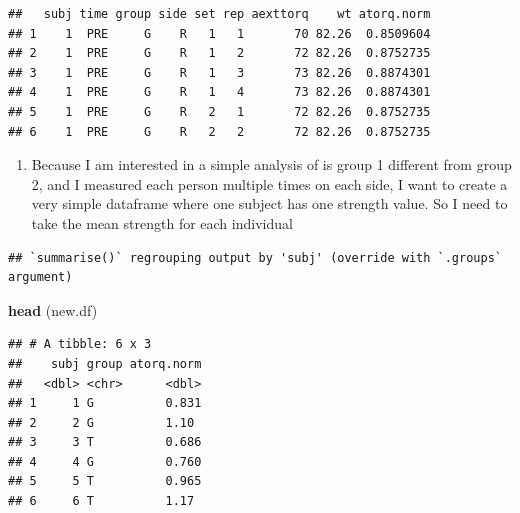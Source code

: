 \documentclass[
]{book}
\newenvironment{Shaded}{\begin{snugshade}}{\end{snugshade}}
\newcommand{\DataTypeTok}[1]{\textcolor[rgb]{0.13,0.29,0.53}{#1}}
\newcommand{\KeywordTok}[1]{\textcolor[rgb]{0.13,0.29,0.53}{\textbf{#1}}}
\newcommand{\NormalTok}[1]{#1}
\newcommand{\OperatorTok}[1]{\textcolor[rgb]{0.81,0.36,0.00}{\textbf{#1}}}
\newcommand{\StringTok}[1]{\textcolor[rgb]{0.31,0.60,0.02}{#1}}
\providecommand{\tightlist}{%
  \setlength{\itemsep}{0pt}\setlength{\parskip}{0pt}}
\begin{document}
\begin{verbatim}
##   subj time group side set rep aexttorq    wt atorq.norm
## 1    1  PRE     G    R   1   1       70 82.26  0.8509604
## 2    1  PRE     G    R   1   2       72 82.26  0.8752735
## 3    1  PRE     G    R   1   3       73 82.26  0.8874301
## 4    1  PRE     G    R   1   4       73 82.26  0.8874301
## 5    1  PRE     G    R   2   1       72 82.26  0.8752735
## 6    1  PRE     G    R   2   2       72 82.26  0.8752735
\end{verbatim}

\begin{enumerate}
\def\labelenumi{\arabic{enumi}.}
\setcounter{enumi}{5}
\tightlist
\item
  Because I am interested in a simple analysis of is group 1 different from group 2, and I measured each person multiple times on each side, I want to create a very simple dataframe where one subject has one strength value. So I need to take the mean strength for each individual
\end{enumerate}

\begin{Shaded}
\end{Shaded}

\begin{verbatim}
## `summarise()` regrouping output by 'subj' (override with `.groups` argument)
\end{verbatim}

\begin{Shaded}
\begin{Highlighting}[]
\KeywordTok{head}\NormalTok{ (new.df)}
\end{Highlighting}
\end{Shaded}

\begin{verbatim}
## # A tibble: 6 x 3
##    subj group atorq.norm
##   <dbl> <chr>      <dbl>
## 1     1 G          0.831
## 2     2 G          1.10 
## 3     3 T          0.686
## 4     4 G          0.760
## 5     5 T          0.965
## 6     6 T          1.17
\end{verbatim}
\end{document}
